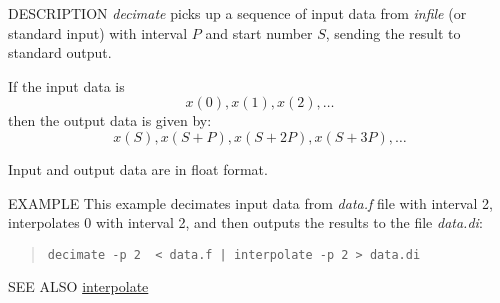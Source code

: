 \begin{synopsis}
\item[decimate] [ --p $P$ ] [ --s $S$ ] [ {\em infile} ]
\end{synopsis}

\begin{qsection}{DESCRIPTION}
{\em decimate} picks up a sequence of input data
from {\em infile} (or standard input)
with interval $P$ and start number $S$,
sending the result to standard output.

If the input data is
\begin{displaymath}
 x(0), x(1), x(2), \dots
\end{displaymath}
then the output data is given by:
\begin{displaymath}
 x(S), x(S+P), x(S+2P), x(S+3P),\dots
\end{displaymath}
\par
Input and output data are in float format.
\end{qsection}

\begin{options}
\end{options}

\begin{qsection}{EXAMPLE}
This example decimates input data from {\em data.f} file with interval 2,
interpolates 0 with interval 2, and then outputs the results to
the file {\em data.di}:
\begin{quote}
  \verb!decimate -p 2  < data.f | interpolate -p 2 > data.di!
\end{quote}
\end{qsection}

\begin{qsection}{SEE ALSO}
\hyperlink{interpolate}{interpolate}
\end{qsection}
